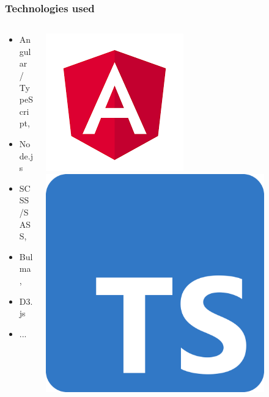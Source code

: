\documentclass{beamer}
\begin{document}
\begin{frame}
	\begin{figure}
		\frametitle{Technologies used}
		\begin{columns}%
			\begin{column}{.4\textwidth}%
				\begin{itemize}
					\item Angular / TypeScript,
					\item Node.js
					\item SCSS/SASS,  
					\item Bulma,
					\item D3.js
					\item ...
				\end{itemize}
			\end{column}
			\begin{column}{.3\textwidth}
				\centering
					\includegraphics[height=.15\textheight]{angular.png}
					\includegraphics[height=.15\textheight]{typescript.png}

\end{column}
\end{columns}
\end{figure}
\end{frame}
\end{document}
